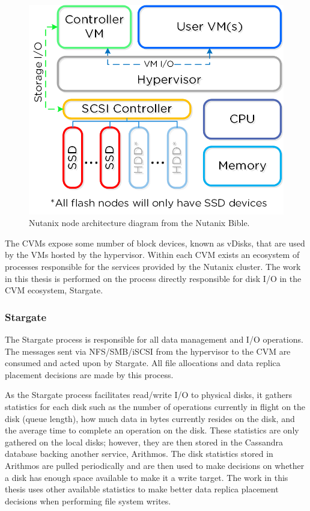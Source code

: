 \documentclass[12pt]{article}
\begin{document}
    \begin{figure}[htbp]
      \centering
      \includegraphics[scale=1.0]{images/converged_platform.png} 
      \caption{Nutanix node architecture diagram from the Nutanix
               Bible\cite{bible}.}
      \label{fig:adsf-architecture}
    \end{figure}

    The CVMs expose some number of block devices, known as vDisks, that are
    used by the VMs hosted by the hypervisor. Within each CVM exists an
    ecosystem of processes responsible for the services provided by the Nutanix
    cluster. The work in this thesis is performed on the process directly
    responsible for disk I/O in the CVM ecosystem, Stargate.

    \subsubsection{Stargate} \label{section-stargate}

    The Stargate process is responsible for all data management and I/O
    operations. The messages sent via NFS/SMB/iSCSI from the hypervisor to the
    CVM are consumed and acted upon by Stargate. All file allocations and data
    replica placement decisions are made by this process.

    As the Stargate process facilitates read/write I/O to physical disks, it
    gathers statistics for each disk such as the number of operations currently
    in flight on the disk (queue length), how much data in bytes currently
    resides on the disk, and the average time to complete an operation on the
    disk. These statistics are only gathered on the local disks; however, they
    are then stored in the Cassandra database backing another service,
    Arithmos.  The disk statistics stored in Arithmos are pulled periodically
    and are then used to make decisions on whether a disk has enough space
    available to make it a write target. The work in this thesis uses other
    available statistics to make better data replica placement decisions when
    performing file system writes.
\end{document}
